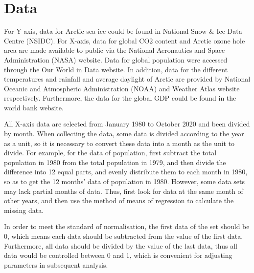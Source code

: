 \section{Data} %
For Y-axis, data for Arctic sea ice could be found in National Snow \& Ice Data Centre (NSIDC). For X-axis, data for global CO2 content and Arctic ozone hole area are made available to public via the National Aeronautics and Space Administration (NASA) website. Data for global population were accessed through the Our World in Data website. In addition, data for the different temperatures and rainfall and average daylight of Arctic are provided by National Oceanic and Atmospheric Administration (NOAA) and Weather Atlas website respectively. Furthermore, the data for the global GDP could be found in the world bank website.

All X-axis data are selected from January 1980 to October 2020 and been divided by month. When collecting the data, some data is divided according to the year as a unit, so it is necessary to convert these data into a month as the unit to divide. For example, for the data of population, first subtract the total population in 1980 from the total population in 1979, and then divide the difference into 12 equal parts, and evenly distribute them to each month in 1980, so as to get the 12 months’ data of population in 1980. However, some data sets may lack partial months of data. Thus, first look for data at the same month of other years, and then use the method of means of regression to calculate the missing data.

In order to meet the standard of normalisation, the first data of the set should be 0, which means each data should be subtracted from the value of the first data. Furthermore, all data should be divided by the value of the last data, thus all data would be controlled between 0 and 1, which is convenient for adjusting parameters in subsequent analysis.


